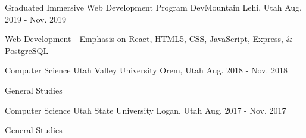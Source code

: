 

\begin{cventries}

  \cventry
    {Graduated Immersive Web Development Program} %
    {DevMountain} %
    {Lehi, Utah} %
    {Aug. 2019 - Nov. 2019} %
    {
      \begin{cvitems} %
        \item {Web Development - Emphasis on React, HTML5, CSS, JavaScript, Express, \& PostgreSQL}
      \end{cvitems}
    }

  \cventry
    {Computer Science} %
    {Utah Valley University} %
    {Orem, Utah} %
    {Aug. 2018 - Nov. 2018} %
    {
      \begin{cvitems} %
        \item {General Studies}
      \end{cvitems}
    }

  \cventry
    {Computer Science} %
    {Utah State University} %
    {Logan, Utah} %
    {Aug. 2017 - Nov. 2017} %
    {
      \begin{cvitems} %
        \item {General Studies}
      \end{cvitems}
    }

\end{cventries}
